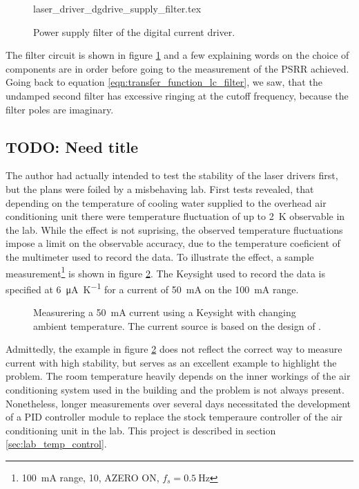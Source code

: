 \begin{figure}[ht]
    \centering
        {laser_driver_dgdrive_supply_filter.tex}
    \caption{Power supply filter of the digital current driver.}
    \label{fig:laser_driver_dgdrive_filter}
\end{figure}

The filter circuit is shown in figure \ref{fig:laser_driver_dgdrive_filter} and a few explaining words on the choice of components are in order before going to the measurement of the PSRR achieved. Going back to equation \ref{eqn:transfer_function_lc_filter}, we saw, that the undamped second filter has excessive ringing at the cutoff frequency, because the filter poles are imaginary.

\clearpage
\subsection{TODO: Need title}
The author had actually intended to test the stability of the laser drivers first, but the plans were foiled by a misbehaving lab. First tests revealed, that depending on the temperature of cooling water supplied to the overhead air conditioning unit there were temperature fluctuation of up to \qty{2}{\K} observable in the lab. While the effect is not suprising, the observed temperature fluctuations impose a limit on the observable accuracy, due to the temperature coeficient of the multimeter used to record the data. To illustrate the effect, a sample measurement\footnote{\qty{100}{\mA} range, \qty{10}{\plc}, AZERO ON, $f_s = \qty{0.5}{\Hz}$} is shown in figure \ref{fig:laser_driver_aircon}. The Keysight  used to record the data is specified at \qty{6}{\uA \per \K} for a current of \qty{50}{\mA} on the \qty{100}{\mA} range.

\begin{figure}[ht]
    \centering
    
    \caption{Measurering a \qty{50}{\mA} current using a Keysight  with changing ambient temperature. The current source is based on the design of \citeauthor{laser_driver_digital}.}
    \label{fig:laser_driver_aircon}
\end{figure}

Admittedly, the example in figure \ref{fig:laser_driver_aircon} does not reflect the correct way to measure current with high stability, but serves as an excellent example to highlight the problem. The room temperature heavily depends on the inner workings of the air conditioning system used in the building and the problem is not always present. Nonetheless, longer measurements over several days necessitated the development of a PID controller module to replace the stock temperaure controller of the air conditioning unit in the lab. This project is described in section \ref{sec:lab_temp_control}.

